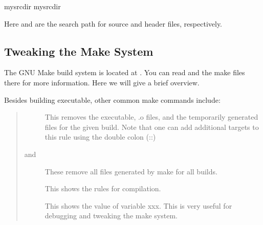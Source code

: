\documentclass[letterpaper,10pt,english]{sphinxmanual}
\begin{document}
\begin{sphinxVerbatim}[commandchars=\\\{\}]
  mysrcdir
  mysrcdir
\end{sphinxVerbatim}

\sphinxAtStartPar
Here  and  are the search path for
source and header files, respectively.


\subsection{Tweaking the Make System}
\label{\detokenize{BuildingAMReX:tweaking-the-make-system}}
\sphinxAtStartPar
The GNU Make build system is located at .  You can read
 and the make files there for more information. Here we will give
a brief overview.

\sphinxAtStartPar
Besides building executable, other common make commands include:
\begin{quote}
\begin{description}
\item[{}] \leavevmode
\sphinxAtStartPar
This removes the executable, .o files, and the temporarily generated
files for the given build. Note that one can add
additional targets to this rule using the double colon (::)

\item[{ and }] \leavevmode
\sphinxAtStartPar
These remove all files generated by make for all builds.

\item[{}] \leavevmode
\sphinxAtStartPar
This shows the rules for compilation.

\item[{}] \leavevmode
\sphinxAtStartPar
This shows the value of variable xxx. This is very useful for debugging
and tweaking the make system.

\end{description}
\end{quote}
\end{document}
